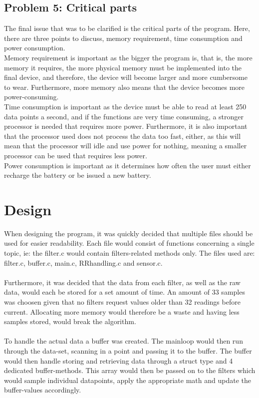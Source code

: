 \documentclass[12pt,a4paper]{article}
\begin{document}
\subsection{Problem 5: Critical parts}
	The final issue that was to be clarified is the critical parts of the program. Here, there are three points to discuss, memory requirement, time consumption and power consumption.\\
	Memory requirement is important as the bigger the program is, that is, the more memory it requires, the more physical memory must be implemented into the final device, and therefore, the device will become larger and more cumbersome to wear. Furthermore, more memory also means that the device becomes more power-consuming.\\
	Time consumption is important as the device must be able to read at least 250 data points a second, and if the functions are very time consuming, a stronger processor is needed that requires more power. Furthermore, it is also important that the processor used does not process the data too fast, either, as this will mean that the processor will idle and use power for nothing, meaning a smaller processor can be used that requires less power.\\
	Power consumption is important as it determines how often the user must either recharge the battery or be issued a new battery.\\
	
\section{Design}
	When designing the program, it was quickly decided that multiple files should be used for easier readability. Each file would consist of functions concerning a single topic, ie: the filter.c would contain filters-related methods only. The files used are: filter.c, buffer.c, main.c, RRhandling.c and sensor.c.\\
	\\
	Furthermore, it was decided that the data from each filter, as well as the raw data, would each be stored for a set amount of time. An amount of 33 samples was choosen given that no filters request values older than 32 readings before current. Allocating more memory would therefore be a waste and having less samples stored, would break the algorithm.\\
	\\
	To handle the actual data a buffer was created. The mainloop would then run through the data-set, scanning in a point and passing it to the buffer. The buffer would then handle storing and retrieving data through a struct type and 4 dedicated buffer-methods. This array would then be passed on to the filters which would sample individual datapoints, apply the appropriate math and update the buffer-values accordingly.
	\\
	\\
\end{document}
